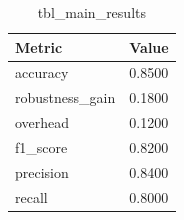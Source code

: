 \begin{table}[htbp]
\centering
\caption{tbl_main_results}
\label{tab:tbl_main_results}
\begin{tabular}{ll}
\toprule
Metric & Value \\
\midrule
accuracy & 0.8500 \\
robustness_gain & 0.1800 \\
overhead & 0.1200 \\
f1_score & 0.8200 \\
precision & 0.8400 \\
recall & 0.8000 \\
\bottomrule
\end{tabular}
\end{table}